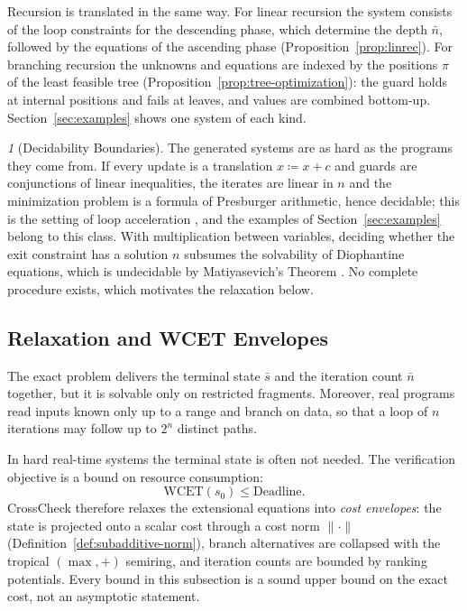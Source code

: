 \documentclass[oneside,english]{amsart}
\numberwithin{equation}{section}
\numberwithin{figure}{section}
\theoremstyle{plain}
\theoremstyle{definition}
\theoremstyle{plain}
\theoremstyle{remark}
\newtheorem*{rem*}{\protect\remarkname}
\theoremstyle{plain}
\theoremstyle{definition}
\theoremstyle{plain}
\theoremstyle{remark}
\providecommand{\remarkname}{Remark}
\begin{document}
Recursion is translated in the same way. For linear recursion the system consists of the loop constraints for the descending phase, which determine the depth $\bar{n}$, followed by the equations of the ascending phase (Proposition~\ref{prop:linrec}). For branching recursion the unknowns and equations are indexed by the positions $\pi$ of the least feasible tree (Proposition~\ref{prop:tree-optimization}): the guard holds at internal positions and fails at leaves, and values are combined bottom-up. Section~\ref{sec:examples} shows one system of each kind.

\begin{rem*}[Decidability Boundaries]
The generated systems are as hard as the programs they come from. If every update is a translation $x \coloneqq x + c$ and guards are conjunctions of linear inequalities, the iterates are linear in $n$ and the minimization problem is a formula of Presburger arithmetic, hence decidable; this is the setting of loop acceleration \cite{bardin2008fast}, and the examples of Section~\ref{sec:examples} belong to this class. With multiplication between variables, deciding whether the exit constraint has a solution $n$ subsumes the solvability of Diophantine equations, which is undecidable by Matiyasevich's Theorem \cite{matiyasevich1970enumerable}. No complete procedure exists, which motivates the relaxation below.
\end{rem*}

\subsection{Relaxation and WCET Envelopes}
\label{subsec:asymptotic-relaxation}

The exact problem delivers the terminal state $\bar{s}$ and the iteration count $\bar{n}$ together, but it is solvable only on restricted fragments. Moreover, real programs read inputs known only up to a range and branch on data, so that a loop of $n$ iterations may follow up to $2^n$ distinct paths.

In hard real-time systems the terminal state is often not needed. The verification objective is a bound on resource consumption:
\[
\text{WCET}(s_0) \le \text{Deadline}.
\]
CrossCheck therefore relaxes the extensional equations into \textit{cost envelopes}: the state is projected onto a scalar cost through a cost norm $\|\cdot\|$ (Definition~\ref{def:subadditive-norm}), branch alternatives are collapsed with the tropical $(\max, +)$ semiring, and iteration counts are bounded by ranking potentials. Every bound in this subsection is a sound upper bound on the exact cost, not an asymptotic statement.
\end{document}

